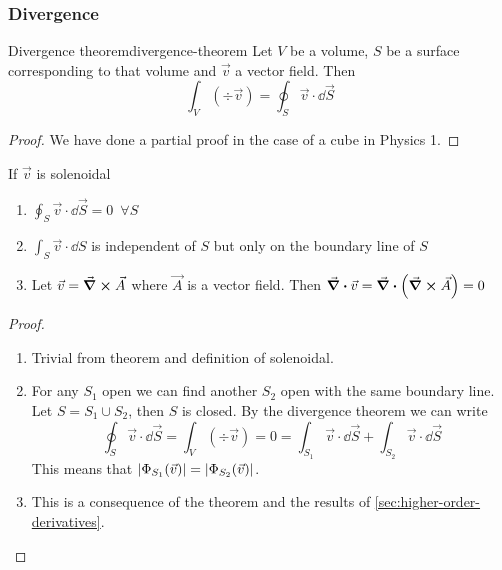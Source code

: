 \documentclass[12pt]{extarticle}
\begin{document}
\subsubsection{Divergence}

\begin{theorem}{Divergence theorem}{divergence-theorem}
    Let $V$ be a volume, $S$ be a surface corresponding to that volume and $\vec v$ a vector field.
    Then
    \begin{equation}
        \int_V \left(\div \vec v\right) = \oint_S \vec v \cdot \dd{\vec S}
    \end{equation}
\end{theorem}

\begin{proof}
    We have done a partial proof in the case of a cube in Physics 1.
\end{proof}

\begin{corollary}{}{}
    If $\vec v$ is solenoidal
    \begin{enumerate}
        \item $\oint_S \vec v \cdot \dd{\vec S} = 0 \enspace \forall S$
        \item $\int_S \vec v \cdot \dd{S}$ is independent of $S$ but only on the boundary line of $S$
        \item Let $\vec v = \curl \vec A$ where $\vec A$ is a vector field. Then $\div \vec v = \div (\curl \vec A) = 0$
    \end{enumerate}
\end{corollary}

\begin{proof}
    \skiplineafterproof
    \begin{enumerate}
        \item Trivial from theorem and definition of solenoidal.
        \item
              For any $S_1$ open we can find another $S_2$ open with the same boundary line.
              Let $S = S_1 \cup S_2$, then $S$ is closed.
              By the divergence theorem we can write
              \begin{equation}
                  \oint_S \vec v \cdot \dd{\vec S} = \int_V \left(\div \vec v\right) = 0 = \int_{S_1} \vec v \cdot \dd{\vec S} + \int_{S_2} \vec v \cdot \dd{\vec S}
              \end{equation}
              This means that $\abs{\Phi_{S_1}(\vec v)} = \abs{\Phi_{S_2} (\vec v)}$.
        \item This is a consequence of the theorem and the results of \cref{sec:higher-order-derivatives}.
    \end{enumerate}
\end{proof}
\end{document}
